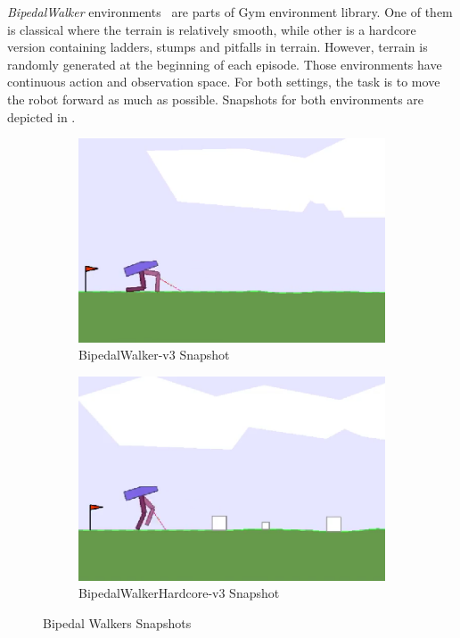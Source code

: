 \textit{BipedalWalker} environments~\cite{noauthor_bipedalwalker-v2_2021, noauthor_bipedalwalkerhardcore-v2_2021} are parts of Gym environment library. 
One of them is classical where the terrain is relatively smooth, while other is a hardcore version containing ladders, stumps and pitfalls in terrain. 
However, terrain is randomly generated at the beginning of each episode.
Those environments have continuous action and observation space. 
For both settings, the task is to move the robot forward as much as possible. 
Snapshots for both environments are depicted in .
\begin{figure}
	\begin{subfigure}{.5\textwidth}
		\centering
		\includegraphics[width=0.9\linewidth]{figures/bipedal/classic.png}
		\caption{BipedalWalker-v3 Snapshot~\cite{noauthor_bipedalwalker-v2_2021}}
		\label{fig:bipedal_walker_classic}
	\end{subfigure}
	\begin{subfigure}{.5\textwidth}
		\centering
		\includegraphics[width=0.9\linewidth]{figures/bipedal/hardcore.png}
		\caption{BipedalWalkerHardcore-v3 Snapshot~\cite{noauthor_bipedalwalkerhardcore-v2_2021}}
		\label{fig:bipedal_walker_hardcore}
	\end{subfigure}
	\caption{Bipedal Walkers Snapshots}
	\label{fig:bipedal_walkers}
\end{figure}

